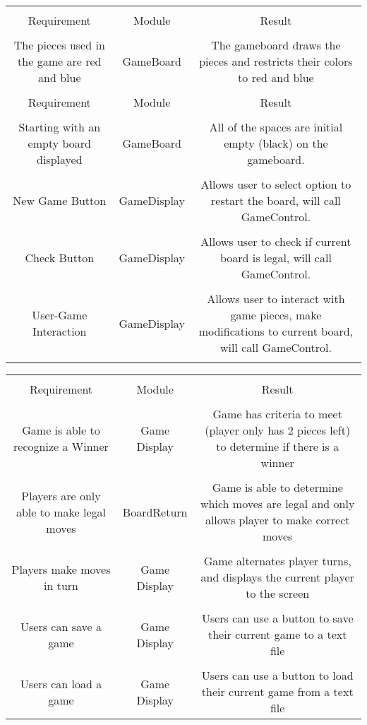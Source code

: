 \documentclass[12pt]{article}
\begin{document}
		\begin{tabularx}{\linewidth}{|C|C|C|}
			\hline \\
			Requirement & Module & Result \\
			\hline \\
			The pieces used in the game are red and blue & GameBoard & The gameboard draws the pieces and restricts their colors to red and blue \\
			\hline \\
			Requirement & Module & Result \\
			\hline \\
			Starting with an empty board displayed & GameBoard & All of the spaces are initial empty (black) on the gameboard. \\
			\hline \\
			New Game Button & GameDisplay & Allows user to select option to restart the board, will call GameControl. \\
			\hline \\
			Check Button & GameDisplay  & Allows user to check if current board is legal, will call GameControl. \\
			\hline \\
			User-Game Interaction & GameDisplay &Allows user to interact with game pieces, make modifications to current board, will call GameControl. \\
			\hline \\	
	\end{tabularx}
		\begin{tabularx}{\linewidth}{|C|C|C|}
			\hline \\
			Requirement & Module & Result \\
			\hline \\
			Game is able to recognize a Winner & Game Display & Game has criteria to meet (player only has 2 pieces left) to determine if there is a winner \\
			\hline \\
			Players are only able to make legal moves & BoardReturn & Game is able to determine which moves are legal and only allows player to make correct moves \\
			\hline \\
			Players make moves in turn & Game Display & Game alternates player turns, and displays the current player to the screen \\
			\hline \\
			Users can save a game & Game Display & Users can use a button to save their current game to a text file \\
			\hline \\
			Users can load a game & Game Display & Users can use a button to load their current game from a text file \\
			\hline
				
		\end{tabularx}
	
\end{document}
